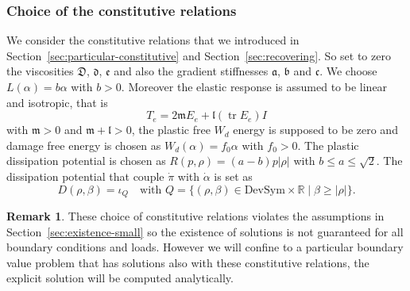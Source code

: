 \documentclass[a4paper,10pt,twoside]{amsbook}
\numberwithin{section}{chapter}
\numberwithin{equation}{chapter}
\theoremstyle{definition}
\newtheorem{rmk}[prop]{Remark}
\DeclareMathOperator{\tr}{tr}
\begin{document}
\subsubsection*{Choice of the constitutive relations} We consider the constitutive relations that we introduced in Section~\ref{sec:particular-constitutive} and Section~\ref{sec:recovering}. So set to zero the viscosities $\mathfrak D$, $\mathfrak{d}$, $\mathfrak{e}$ and also the gradient stiffnesses $\mathfrak{a}$, $\mathfrak{b}$ and $\mathfrak{c}$. We choose $L(\alpha)=b\alpha$ with $b>0$. Moreover the elastic response is assumed to be linear and isotropic, that is
\[
T_e=2\mathfrak{m}E_e+\mathfrak{l}(\tr E_e)I
\]
with $\mathfrak{m}>0$ and $\mathfrak{m}+\mathfrak{l}>0$, the plastic free $W_d$ energy is supposed to be zero and damage free energy is chosen as $W_d(\alpha)=f_0\alpha$ with $f_0>0$. The plastic dissipation potential is chosen as $R(p,\rho)=(a-b)p|\rho|$ with $b\le a\le\sqrt{2}$. The dissipation potential that couple $\dot\pi$ with $\dot\alpha$ is set as
\[
D(\rho,\beta)=\iota_Q\quad\text{with $Q=\{(\rho,\beta)\in\text{DevSym}\times\mathbb{R}\;|\;\beta\ge|\rho|\}$}.
\]
\begin{rmk}
These choice of constitutive relations violates the assumptions in Section~\ref{sec:existence-small} so the existence of solutions is not guaranteed for all boundary conditions and loads. However we will confine to a particular boundary value problem that has solutions also with these constitutive relations, the explicit solution will be computed analytically. 
\end{rmk}
\end{document}

